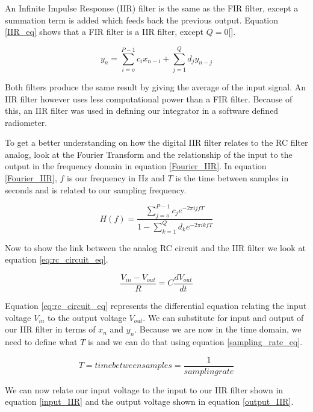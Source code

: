 An Infinite Impulse Response (IIR) filter is the same as the FIR filter, except a summation term is added which feeds back the previous output.  Equation \ref{IIR_eq} shows that a FIR filter is a IIR filter, except $Q=0$[\cite{Cross}]. 

\begin{equation}\label{IIR_eq}
y_n=\displaystyle\sum\limits_{i=o}^{P-1} c_ix_{n-i}+\displaystyle\sum\limits_{j=1}^{Q} d_jy_{n-j}
\end{equation}

Both filters produce the same result by giving the average of the input signal.  An IIR filter however uses less computational power than a FIR filter.  Because of this, an IIR filter was used in defining our integrator in a software defined radiometer.

To get a better understanding on how the digital IIR filter relates to the RC filter analog, look at the Fourier Transform and the relationship of the input to the output in the frequency domain in equation \ref{Fourier_IIR}.  In equation \ref{Fourier_IIR}, $f$ is our frequency in Hz and $T$ is the time between samples in seconds and is related to our sampling frequency.

\begin{equation}\label{Fourier_IIR}
H(f)=\frac{\displaystyle\sum\limits_{j=o}^{P-1} c_je^{-2\pi ijfT}}{1-\displaystyle\sum\limits_{k=1}^{Q} d_ke^{-2\pi ikfT}}
\end{equation}

Now to show the link between the analog RC circuit and the IIR filter we look at equation \ref{eq:rc_circuit_eq}.  

\begin{equation}\label{eq:rc_circuit_eq}
\frac{V_{in}-V_{out}}{R}=C\frac{dV_{out}}{dt}
\end{equation}

Equation \ref{eq:rc_circuit_eq} represents the differential equation relating the input voltage $V_{in}$ to the output voltage $V_{out}$.  We can substitute for input and output of our IIR filter in terms of $x_n$ and $y_n$.  Because we are now in the time domain, we need to define what $T$ is and we can do that using equation \ref{sampling_rate_eq}.

\begin{equation}\label{sampling_rate_eq}
T=time between samples=\frac{1}{sampling rate}
\end{equation}

We can now relate our input voltage to the input to our IIR filter shown in equation \ref{input_IIR} and the output voltage shown in equation \ref{output_IIR}.

